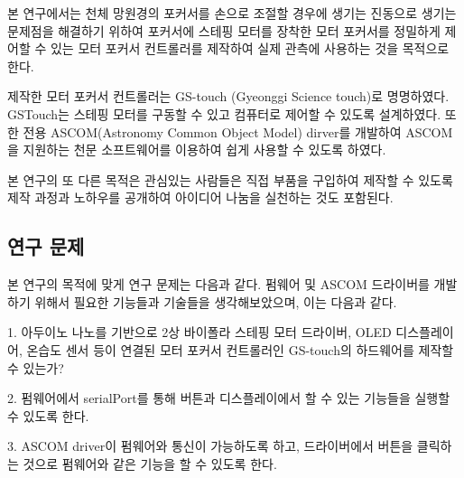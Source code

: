 본 연구에서는 천체 망원경의 포커서를 손으로 조절할 경우에 생기는 진동으로 생기는 문제점을 해결하기 위하여 포커서에 스테핑 모터를 장착한 모터 포커서를 정밀하게 제어할 수 있는 모터 포커서 컨트롤러를 제작하여 실제 관측에 사용하는 것을 목적으로 한다. 

제작한 모터 포커서 컨트롤러는 GS-touch (Gyeonggi Science touch)로 명명하였다. GSTouch는 스테핑 모터를 구동할 수 있고 컴퓨터로 제어할 수 있도록 설계하였다. 또한 전용 ASCOM(Astronomy Common Object Model) dirver를 개발하여 ASCOM을 지원하는 천문 소프트웨어를 이용하여 쉽게 사용할 수 있도록 하였다.

본 연구의 또 다른 목적은 관심있는 사람들은 직접 부품을 구입하여 제작할 수 있도록 제작 과정과 노하우를 공개하여 아이디어 나눔을 실천하는 것도 포함된다.


\subsection{연구 문제}

본 연구의 목적에 맞게 연구 문제는 다음과 같다. 펌웨어 및 ASCOM 드라이버를 개발하기 위해서 필요한 기능들과 기술들을 생각해보았으며, 이는 다음과 같다.

1. 아두이노 나노를 기반으로 2상 바이폴라 스테핑 모터 드라이버, OLED 디스플레이어, 온습도 센서 등이 연결된 모터 포커서 컨트롤러인 GS-touch의 하드웨어를 제작할 수 있는가?

2. 펌웨어에서 serialPort를 통해 버튼과 디스플레이에서 할 수 있는 기능들을 실행할 수 있도록 한다.

3. ASCOM driver이 펌웨어와 통신이 가능하도록 하고, 드라이버에서 버튼을 클릭하는 것으로 펌웨어와 같은 기능을 할 수 있도록 한다.